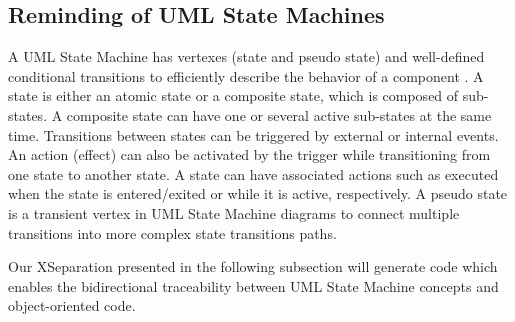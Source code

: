 \subsection{Reminding of UML State Machines} 
A UML State Machine has vertexes (state and pseudo state) and well-defined conditional transitions to efficiently describe the behavior of a component \cite{possepapyrusrt, Ringert2013}.
A state is either an atomic state or a composite state, which is composed of sub-states. 
A composite state can have one or several active sub-states at the same time. %
Transitions between states can be triggered by external or internal events. 
An action (effect) can also be activated by the trigger while transitioning from one state to another state. 
A state can have associated actions such as  executed when the state is entered/exited or while it is active, respectively. 
A pseudo state is a transient vertex in UML State Machine diagrams to connect multiple transitions into more complex state transitions paths.


Our XSeparation presented in the following subsection will generate code which enables the bidirectional traceability between UML State Machine concepts and object-oriented code.

	
